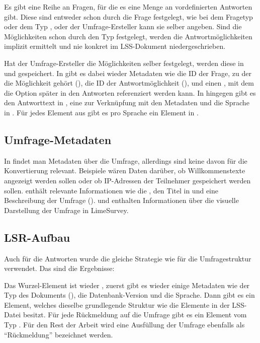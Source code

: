 Es gibt eine Reihe an Fragen, für die es eine Menge an vordefinierten Antworten gibt.
Diese sind entweder schon durch die Frage festgelegt, wie bei dem Fragetyp  oder dem Typ , oder der Umfrage-Ersteller kann sie selber angeben.
Sind die Möglichkeiten schon durch den Typ festgelegt, werden die Antwortmöglichkeiten implizit ermittelt und nie konkret im LSS-Dokument niedergeschrieben.

Hat der Umfrage-Ersteller die Möglichkeiten selber festgelegt, werden diese in  und  gespeichert.
In  gibt es dabei wieder Metadaten wie die ID der Frage, zu der die Möglichkeit gehört (), die ID der Antwortmöglichkeit (), und einen , mit dem die Option später in den Antworten referenziert werden kann.
In  hingegen gibt es den Antworttext in , eine  zur Verknüpfung mit den Metadaten und die Sprache in .
Für jedes Element aus  gibt es pro Sprache ein Element in .

\subsection{Umfrage-Metadaten}
\label{a:survey_meta}

In  findet man Metadaten über die Umfrage, allerdings sind keine davon für die Konvertierung relevant.
Beispiele wären Daten darüber, ob Willkommenstexte angezeigt werden sollen oder ob IP-Adressen der Teilnehmer gespeichert werden sollen.
 enthält relevante Informationen wie die , den Titel in  und eine Beschreibung der Umfrage ().
 und  enthalten Informationen über die visuelle Darstellung der Umfrage in LimeSurvey.

\subsection{LSR-Aufbau}
\label{a:lsr}

Auch für die Antworten wurde die gleiche Strategie wie für die Umfragestruktur verwendet.
Das sind die Ergebnisse:

Das Wurzel-Element ist wieder , zuerst gibt es wieder einige Metadaten wie der Typ des Dokuments (), die Datenbank-Version und die Sprache.
Dann gibt es ein  Element, welches dieselbe grundlegende Struktur wie die Elemente in der LSS-Datei besitzt.
Für jede Rückmeldung auf die Umfrage gibt es ein Element vom Typ . Für den Rest der Arbeit wird eine Ausfüllung der Umfrage ebenfalls als \enquote{Rückmeldung}  bezeichnet werden.

